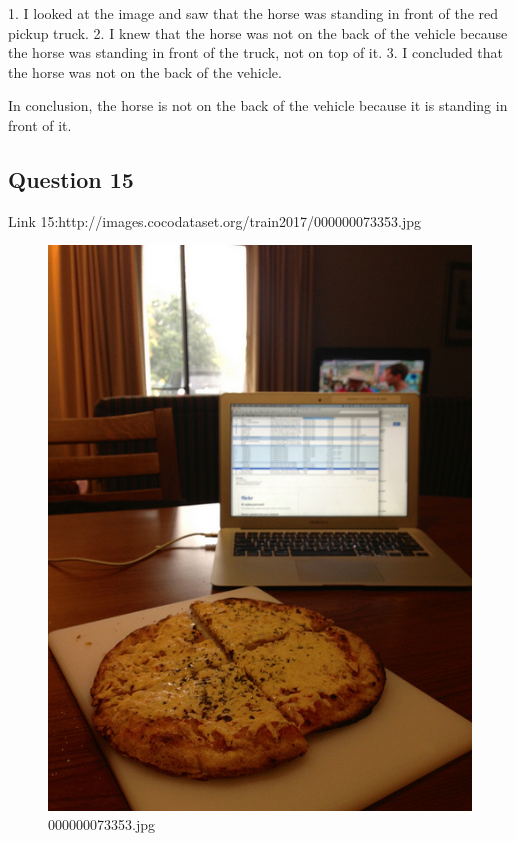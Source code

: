 \begin{enumerate}
        1. I looked at the image and saw that the horse was standing in front of the red pickup truck.
        2. I knew that the horse was not on the back of the vehicle because the horse was standing in front of the truck, not on top of it.
        3. I concluded that the horse was not on the back of the vehicle.
        
        In conclusion, the horse is not on the back of the vehicle because it is standing in front of it.
    \end{enumerate}
\subsection*{Question 15}
Link 15:http://images.cocodataset.org/train2017/000000073353.jpg
    \begin{figure}[h]
        \centering
        \includegraphics[width=0.8\linewidth]{../image set/easy/000000073353.jpg}
        \caption{000000073353.jpg}
    \end{figure}
